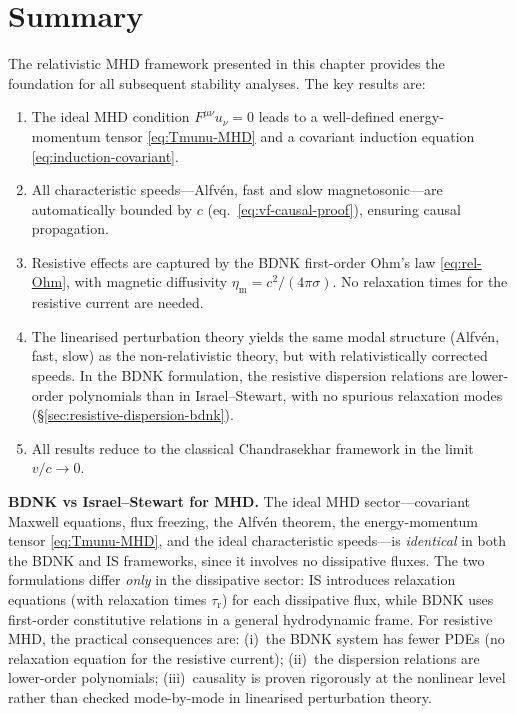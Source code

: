 \section{Summary}
\label{sec:rmhd-summary}

The relativistic MHD framework presented in this chapter provides the
foundation for all subsequent stability analyses.  The key results are:
\begin{enumerate}
  \item The ideal MHD condition $F^{\mu\nu}u_{\nu}=0$ leads to a
        well-defined energy-momentum tensor \eqref{eq:Tmunu-MHD} and a
        covariant induction equation \eqref{eq:induction-covariant}.
  \item All characteristic speeds---Alfv\'en, fast and slow
        magnetosonic---are automatically bounded by $c$
        (eq.~\ref{eq:vf-causal-proof}), ensuring causal propagation.
  \item Resistive effects are captured by the BDNK first-order Ohm's
        law \eqref{eq:rel-Ohm}, with magnetic diffusivity
        $\eta_{\mathrm{m}}=c^{2}/(4\pi\sigma)$.  No relaxation times
        for the resistive current are needed.
  \item The linearised perturbation theory yields the same modal
        structure (Alfv\'en, fast, slow) as the non-relativistic theory,
        but with relativistically corrected speeds.  In the BDNK
        formulation, the resistive dispersion relations are lower-order
        polynomials than in Israel--Stewart, with no spurious relaxation
        modes (\S\ref{sec:resistive-dispersion-bdnk}).
  \item All results reduce to the classical Chandrasekhar framework in
        the limit $v/c\to 0$.
\end{enumerate}

\medskip\noindent
\textbf{BDNK vs Israel--Stewart for MHD.}\quad
The ideal MHD sector---covariant Maxwell equations, flux freezing, the
Alfv\'en theorem, the energy-momentum tensor \eqref{eq:Tmunu-MHD}, and
the ideal characteristic speeds---is \emph{identical} in both the BDNK
and IS frameworks, since it involves no dissipative fluxes.  The two
formulations differ \emph{only} in the dissipative sector: IS introduces
relaxation equations (with relaxation times $\tau_{\mathrm{r}}$) for each
dissipative flux, while BDNK uses first-order constitutive relations in a
general hydrodynamic frame.  For resistive MHD, the practical consequences
are: (i)~the BDNK system has fewer PDEs (no relaxation equation for the
resistive current); (ii)~the dispersion relations are lower-order
polynomials; (iii)~causality is proven rigorously at the nonlinear level
rather than checked mode-by-mode in linearised perturbation theory.

